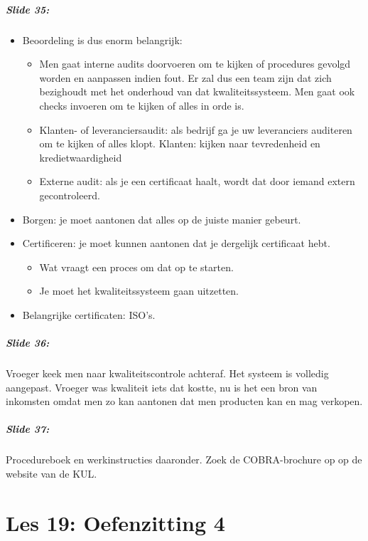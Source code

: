 \documentclass[10pt,a4paper]{report}
\begin{document}
\paragraph{Slide 35:}
\begin{itemize} 
\item Beoordeling is dus enorm belangrijk:
\begin{itemize}
\item Men gaat interne audits doorvoeren om te kijken of procedures gevolgd worden en aanpassen indien fout. Er zal dus een team zijn dat zich bezighoudt met het onderhoud van dat kwaliteitssysteem. Men gaat ook checks invoeren om te kijken of alles in orde is.
\item Klanten- of leveranciersaudit: als bedrijf ga je uw leveranciers auditeren om te kijken of alles klopt. Klanten: kijken naar tevredenheid en kredietwaardigheid
\item Externe audit: als je een certificaat haalt, wordt dat door iemand extern gecontroleerd. 
\end{itemize}
\item Borgen: je moet aantonen dat alles op de juiste manier gebeurt.
\item Certificeren: je moet kunnen aantonen dat je dergelijk certificaat hebt. 
\begin{itemize}
\item Wat vraagt een proces om dat op te starten. 
\item Je moet het kwaliteitssysteem gaan uitzetten.
\end{itemize}
\item Belangrijke certificaten: ISO's.
\end{itemize}

\paragraph{Slide 36:} Vroeger keek men naar kwaliteitscontrole achteraf. Het systeem is volledig aangepast. Vroeger was kwaliteit iets dat kostte, nu is het een bron van inkomsten omdat men zo kan aantonen dat men producten kan en mag verkopen. 

\paragraph{Slide 37:} Procedureboek en werkinstructies daaronder. 
Zoek de COBRA-brochure op op de website van de KUL.

\chapter{Les 19: Oefenzitting 4}
\end{document}
